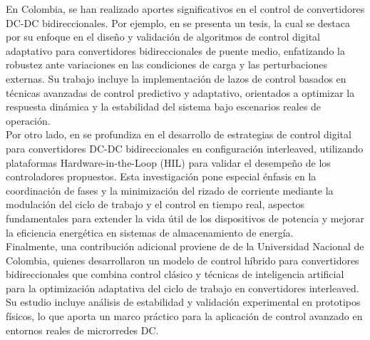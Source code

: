 En Colombia, se han realizado aportes significativos en el control de convertidores DC-DC bidireccionales. Por ejemplo, en \cite{narvaez2024hess} se presenta un tesis, la cual se destaca por su enfoque en el diseño y validación de algoritmos de control digital adaptativo para convertidores bidireccionales de puente medio, enfatizando la robustez ante variaciones en las condiciones de carga y las perturbaciones externas. Su trabajo incluye la implementación de lazos de control basados en técnicas avanzadas de control predictivo y adaptativo, orientados a optimizar la respuesta dinámica y la estabilidad del sistema bajo escenarios reales de operación.\\
Por otro lado, en \cite{yate2024control} se profundiza en el desarrollo de estrategias de control digital para convertidores DC-DC bidireccionales en configuración interleaved, utilizando plataformas Hardware-in-the-Loop (HIL) para validar el desempeño de los controladores propuestos. Esta investigación pone especial énfasis en la coordinación de fases y la minimización del rizado de corriente mediante la modulación del ciclo de trabajo y el control en tiempo real, aspectos fundamentales para extender la vida útil de los dispositivos de potencia y mejorar la eficiencia energética en sistemas de almacenamiento de energía.\\
Finalmente, una contribución adicional proviene de \cite{gomez2023control} de la Universidad Nacional de Colombia, quienes desarrollaron un modelo de control híbrido para convertidores bidireccionales que combina control clásico y técnicas de inteligencia artificial para la optimización adaptativa del ciclo de trabajo en convertidores interleaved. Su estudio incluye análisis de estabilidad y validación experimental en prototipos físicos, lo que aporta un marco práctico para la aplicación de control avanzado en entornos reales de microrredes DC.
